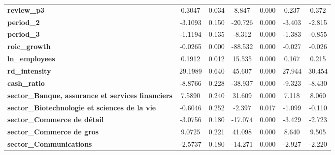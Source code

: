\begin{center}
\begin{tabular}{lcccccc}
\textbf{review\_p3}                                                   &       0.3047  &        0.034     &     8.847  &         0.000        &        0.237    &        0.372     \\
\textbf{period\_2}                                                    &      -3.1093  &        0.150     &   -20.726  &         0.000        &       -3.403    &       -2.815     \\
\textbf{period\_3}                                                    &      -1.1194  &        0.135     &    -8.312  &         0.000        &       -1.383    &       -0.855     \\
\textbf{roic\_growth}                                                 &      -0.0265  &        0.000     &   -88.532  &         0.000        &       -0.027    &       -0.026     \\
\textbf{ln\_employees}                                                &       0.1912  &        0.012     &    15.535  &         0.000        &        0.167    &        0.215     \\
\textbf{rd\_intensity}                                                &      29.1989  &        0.640     &    45.607  &         0.000        &       27.944    &       30.454     \\
\textbf{cash\_ratio}                                                  &      -8.8766  &        0.228     &   -38.937  &         0.000        &       -9.323    &       -8.430     \\
\textbf{sector\_Banque, assurance et services financiers}             &       7.5890  &        0.240     &    31.609  &         0.000        &        7.118    &        8.060     \\
\textbf{sector\_Biotechnologie et sciences de la vie}                 &      -0.6046  &        0.252     &    -2.397  &         0.017        &       -1.099    &       -0.110     \\
\textbf{sector\_Commerce de détail}                                   &      -3.0756  &        0.180     &   -17.074  &         0.000        &       -3.429    &       -2.723     \\
\textbf{sector\_Commerce de gros}                                     &       9.0725  &        0.221     &    41.098  &         0.000        &        8.640    &        9.505     \\
\textbf{sector\_Communications}                                       &      -2.5737  &        0.180     &   -14.271  &         0.000        &       -2.927    &       -2.220     \\

\end{tabular}
\end{center}
